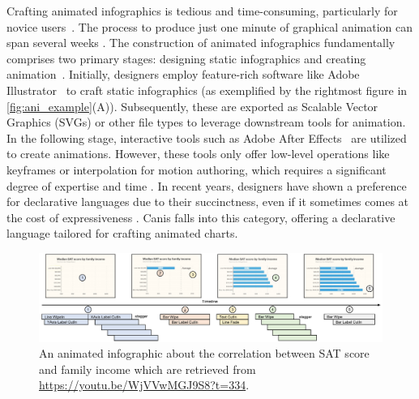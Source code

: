 Crafting animated infographics is tedious and time-consuming, particularly for novice users~\cite{amini2016authoring, hullman2013deeper, shi2021communicating}. The process to produce just one minute of graphical animation can span several weeks \cite{howlong}.
The construction of animated infographics fundamentally comprises two primary stages: designing static infographics and creating animation~\cite{jahanlou2020challenges, shi2021communicating}. Initially, designers employ feature-rich software like Adobe Illustrator~\cite{AdobeAI} to craft static infographics (as exemplified by the rightmost figure in \autoref{fig:ani_example}(A)). Subsequently, these are exported as Scalable Vector Graphics (SVGs) or other file types to leverage downstream tools for animation. 
In the following stage, interactive tools such as Adobe After Effects~\cite{AdobeAE} are utilized to create animations. However, these tools only offer low-level operations like keyframes or interpolation for motion authoring, which requires a significant degree of expertise and time \cite{jahanlou2020challenges}. 
In recent years, designers have shown a preference for declarative languages due to their succinctness, even if it sometimes comes at the cost of expressiveness \cite{mcnutt2023nogrammar}. Canis \cite{ge2020canis} falls into this category, offering a declarative language tailored for crafting animated charts. 


\begin{figure}[h]
  \centering
  \includegraphics[width=\linewidth]{figs/ani_example_tvcg.pdf}
  \caption{An animated infographic about the correlation between SAT score and family income which are retrieved from \url{https://youtu.be/WjVVwMGJ9S8?t=334}.}
  \label{fig:ani_example}
\end{figure}

